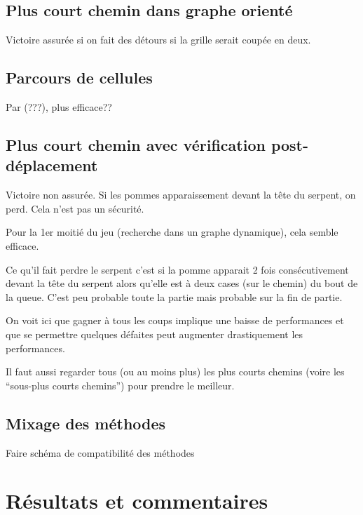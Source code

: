 \documentclass[french,a4paper]{article}
\begin{document}
\subsection{Plus court chemin dans graphe orienté}
Victoire assurée si on fait des détours si la grille serait coupée en deux.

\subsection{Parcours de cellules}
Par (???), plus efficace??

\subsection{Plus court chemin avec vérification post-déplacement}
Victoire non assurée. Si les pommes apparaissement devant la tête du serpent, on perd. Cela n'est pas un sécurité.

Pour la 1er moitié du jeu (recherche dans un graphe dynamique), cela semble efficace.

Ce qu'il fait perdre le serpent c'est si la pomme apparait 2 fois consécutivement devant la tête du serpent alors qu'elle est à deux cases (sur le chemin) du bout de la queue. C'est peu probable toute la partie mais probable sur la fin de partie.

On voit ici que gagner à tous les coups implique une baisse de performances et que se permettre quelques défaites peut augmenter drastiquement les performances.

Il faut aussi regarder tous (ou au moins plus) les plus courts chemins (voire les ``sous-plus courts chemins'') pour prendre le meilleur.

\subsection{Mixage des méthodes}

Faire schéma de compatibilité des méthodes

\section{Résultats et commentaires}





\newpage


\end{document}
